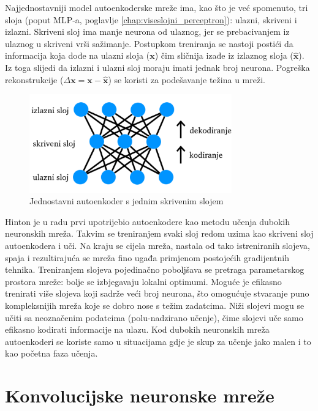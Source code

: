 \documentclass[times, utf8, diplomski, numeric]{fer}
\begin{document}
Najjednostavniji model autoenkoderske mreže ima, kao što je već spomenuto, tri sloja (poput MLP-a, poglavlje \ref{chap:viseslojni_perceptron}): ulazni, skriveni i izlazni. Skriveni sloj ima manje neurona od ulaznog, jer se prebacivanjem iz ulaznog u skriveni vrši sažimanje. Postupkom treniranja se nastoji postići da informacija koja dođe na ulazni sloja ($\boldsymbol{x}$) čim sličnija izađe iz izlaznog sloja ($\hat{\boldsymbol{x}}$). Iz toga slijedi da izlazni i ulazni sloj moraju imati jednak broj neurona. Pogreška rekonstrukcije ($\Delta \boldsymbol{x} = \boldsymbol{x} - \hat{\boldsymbol{x}}$) se koristi za podešavanje težina u mreži.
\begin{figure}[htb]
\centering
\includegraphics[width=330px]{imgs/autoencoder.png}
\caption{Jednostavni autoenkoder s jednim skrivenim slojem}
\label{fig:autoencoder}
\end{figure}

Hinton je u radu \cite{hinton_autoencoder} prvi upotrijebio autoenkodere kao metodu učenja dubokih neuronskih mreža. Takvim se treniranjem svaki sloj redom uzima kao skriveni sloj autoenkodera i uči. Na kraju se cijela mreža, nastala od tako istreniranih slojeva, spaja i rezultirajuća se mreža fino ugađa primjenom postojećih gradijentnih tehnika.
Treniranjem slojeva pojedinačno poboljšava se pretraga parametarskog prostora mreže: bolje se izbjegavaju lokalni optimumi. Moguće je efikasno trenirati više slojeva koji sadrže veći broj neurona, što omogućuje stvaranje puno kompleksnijih mreža koje se dobro nose s težim zadatcima. Niži slojevi mogu se učiti sa neoznačenim podatcima (polu-nadzirano učenje), čime slojevi uče samo efikasno kodirati informacije na ulazu.
Kod dubokih neuronskih mreža autoenkoderi se koriste samo u situacijama gdje je skup za učenje jako malen i to kao početna faza učenja.

\section{Konvolucijske neuronske mreže}
\label{chap:konvolucijske_mreze}
\end{document}
